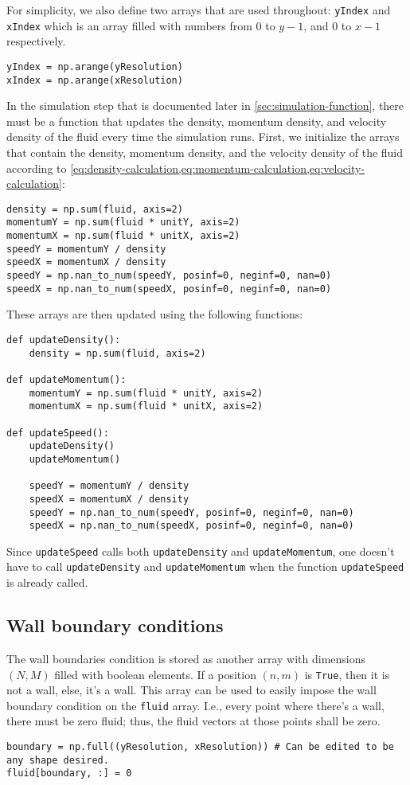 For simplicity, we also define two arrays that are used throughout: \texttt{yIndex} and \texttt{xIndex} which is an array filled with numbers from $0$ to $y - 1$, and $0$ to $x - 1$ respectively.
\begin{verbatim}
yIndex = np.arange(yResolution)
xIndex = np.arange(xResolution)
\end{verbatim}

In the simulation step that is documented later in \cref{sec:simulation-function}, there must be a function that updates the density, momentum density, and velocity density of the fluid every time the simulation runs. First, we initialize the arrays that contain the density, momentum density, and the velocity density of the fluid according to \cref{eq:density-calculation,eq:momentum-calculation,eq:velocity-calculation}:
\begin{verbatim}
density = np.sum(fluid, axis=2)
momentumY = np.sum(fluid * unitY, axis=2)
momentumX = np.sum(fluid * unitX, axis=2)
speedY = momentumY / density
speedX = momentumX / density
speedY = np.nan_to_num(speedY, posinf=0, neginf=0, nan=0)
speedX = np.nan_to_num(speedX, posinf=0, neginf=0, nan=0)
\end{verbatim}
These arrays are then updated using the following functions:
\begin{verbatim}
def updateDensity():
    density = np.sum(fluid, axis=2)

def updateMomentum():
    momentumY = np.sum(fluid * unitY, axis=2)
    momentumX = np.sum(fluid * unitX, axis=2)

def updateSpeed():
    updateDensity()
    updateMomentum()

    speedY = momentumY / density
    speedX = momentumX / density
    speedY = np.nan_to_num(speedY, posinf=0, neginf=0, nan=0)
    speedX = np.nan_to_num(speedX, posinf=0, neginf=0, nan=0)
\end{verbatim}
Since \texttt{updateSpeed} calls both \texttt{updateDensity} and \texttt{updateMomentum}, one doesn't have to call \texttt{updateDensity} and \texttt{updateMomentum} when the function \texttt{updateSpeed} is already called.

\subsection{Wall boundary conditions}

The wall boundaries condition is stored as another array with dimensions $(N, M)$ filled with boolean elements. If a position $(n, m)$ is \texttt{True}, then it is not a wall, else, it's a wall. This array can be used to easily impose the wall boundary condition on the \texttt{fluid} array. I.e., every point where there's a wall, there must be zero fluid; thus, the fluid vectors at those points shall be zero.
\begin{verbatim}
boundary = np.full((yResolution, xResolution)) # Can be edited to be any shape desired.
fluid[boundary, :] = 0
\end{verbatim}

